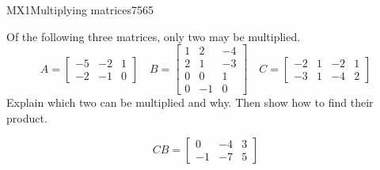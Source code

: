 \begin{exercise}{MX1}{Multiplying matrices}{7565} 
\begin{exerciseStatement} 

Of the following three matrices, only two may be multiplied. \[
          A=\left[\begin{array}{ccc}
-5 & -2 & 1 \\
-2 & -1 & 0
\end{array}\right] \hspace{1em} B=\left[\begin{array}{ccc}
1 & 2 & -4 \\
2 & 1 & -3 \\
0 & 0 & 1 \\
0 & -1 & 0
\end{array}\right] \hspace{1em} C=\left[\begin{array}{cccc}
-2 & 1 & -2 & 1 \\
-3 & 1 & -4 & 2
\end{array}\right]
      \] Explain which two can be multiplied and why. Then show how to find their product.

 \end{exerciseStatement}
 \begin{exerciseAnswer} \[CB=\left[\begin{array}{ccc}
0 & -4 & 3 \\
-1 & -7 & 5
\end{array}\right]\] \end{exerciseAnswer}
 \end{exercise}


